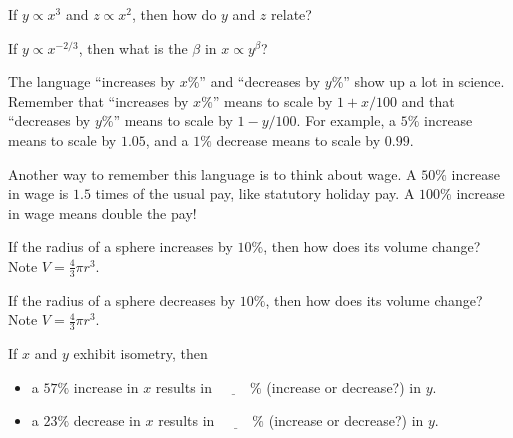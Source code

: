 \documentclass[../main.tex]{subfiles}
\begin{document}
\begin{exercise} \label{ex:propto-relate}
  If \(y \propto x^{3}\) and \(z \propto x^{2}\), then how do  \(y\) and \(z\) relate?

\end{exercise}

\begin{exercise} \label{ex:propto-invert-negative}
  If \(y \propto x^{-2/3}\), then what is the \(\beta\) in \(x \propto y^{\beta}\)?

  \blanks*
\end{exercise}
\clearpage

\faStar{} The language ``increases by \(x\%\)'' and ``decreases by \(y\%\)''  show up a lot in science. Remember that ``increases by \(x\%\)'' means to scale by \(1+x/100\) and that ``decreases by \(y\%\)'' means to scale by \(1 - y/100\).  For example, a \(5\%\) increase means to scale by \(1.05\), and a \(1\%\) decrease means to scale by \(0.99\).

Another way to remember this language is to think about wage. A \(50\%\) increase in wage is \(1.5\) times of the usual pay, like statutory holiday pay. A \(100\%\) increase in wage means double the pay! 

\begin{exercise} \label{ex:percent-sphere-increase}
  If the radius of a sphere increases by \(10\%\), then how does its volume change? Note \(V = \frac{4}{3} \pi r^{3}\).

\end{exercise}

\begin{exercise} \label{ex:percent-sphere-decrease}
  If the radius of a sphere decreases  by \(10\%\), then how does its volume change? Note \(V = \frac{4}{3} \pi r^{3}\).

\end{exercise}

\begin{exercise} \label{ex:percent-isometry}
  If \(x\) and \(y\) exhibit isometry, then 
  \begin{itemize}
    \item a \(57\%\) increase in \(x\) results in \(\underline{\hspace{1cm}}\%\) \underline{\hspace{1in}} (increase or decrease?) in \(y\).
    \item a \(23\%\) decrease in \(x\) results in \(\underline{\hspace{1cm}}\%\) \underline{\hspace{1in}} (increase or decrease?) in \(y\).
  \end{itemize}
\end{exercise}
\clearpage
\end{document}
